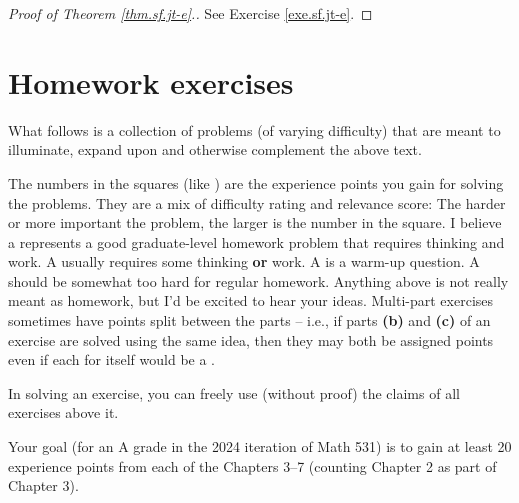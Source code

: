 \begin{proof}
[Proof of Theorem \ref{thm.sf.jt-e}.]See Exercise \ref{exe.sf.jt-e}.
\end{proof}

\newpage

\appendix


\section{\label{chap.hw}Homework exercises}

What follows is a collection of problems (of varying difficulty) that are
meant to illuminate, expand upon and otherwise complement the above text.

The numbers in the squares (like ) are the experience points you gain
for solving the problems. They are a mix of difficulty rating and relevance
score: The harder or more important the problem, the larger is the number in
the square. I believe a  represents a good graduate-level homework
problem that requires thinking and work. A  usually requires some
thinking \textbf{or} work. A  is a warm-up question. A  should
be somewhat too hard for regular homework. Anything above  is not
really meant as homework, but I'd be excited to hear your ideas. Multi-part
exercises sometimes have points split between the parts -- i.e., if parts
\textbf{(b)} and \textbf{(c)} of an exercise are solved using the same idea,
then they may both be assigned  points even if each for itself would
be a .

In solving an exercise, you can freely use (without proof) the claims of all
exercises above it.

Your goal (for an A grade in the 2024 iteration of Math 531) is to gain at
least 20 experience points from each of the Chapters 3--7 (counting Chapter 2
as part of Chapter 3).
